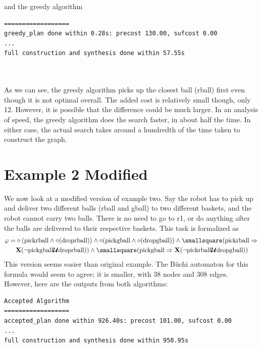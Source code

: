 and the greedy algorithm \\


\begin{minipage}{\textwidth}
\begingroup
\fontsize{9pt}{12pt}\selectfont
\begin{lstlisting}
==================
greedy_plan done within 0.28s: precost 130.00, sufcost 0.00
...
full construction and synthesis done within 57.55s 
\end{lstlisting}
\endgroup
\end{minipage} \\ \\


As we can see, the greedy algorithm picks up the closest ball (rball) first even though it is not optimal overall. The added cost is relatively small though, only 12. However, it is possible that the difference could be much larger. In an analysis of speed, the greedy algorithm does the search faster, in about half the time. In either case, the actual search takes around a hundredth of the time taken to construct the graph.

\section{Example 2 Modified}
We now look at a modified version of example two. Say the robot has to pick up and deliver two different balls (rball and gball) to two different baskets, and the robot cannot carry two balls. There is no need to go to r1, or do anything after the balls are delivered to their respective baskets. This task is formalized as 
\begin{align*}
\small \varphi = & \diamond (\text{pickrball} \wedge \diamond (\text{droprball})) \wedge \diamond(\text{pickgball} \wedge \diamond (\text{dropgball})) \wedge \smallsquare (\text{pickrball} \Rightarrow \\ 
 \small & \textbf{X}(\neg \text{pickgball} \U \text{droprball})) \wedge \smallsquare (\text{pickgball} \Rightarrow \textbf{X} (\neg \text{pickrball} \U \text{dropgball}))
\end{align*}
This version seems easier than original example. The B\"uchi automaton for this formula would seem to agree; it is smaller, with 38 nodes and 308 edges. However, here are the outputs from both algorithms: \\


\begin{minipage}{\textwidth}
\begingroup
\fontsize{9pt}{12pt}\selectfont
\begin{lstlisting}
Accepted Algorithm
==================
accepted_plan done within 926.40s: precost 101.00, sufcost 0.00
...
full construction and synthesis done within 950.95s 
\end{lstlisting}
\endgroup
\end{minipage} \\ \\


